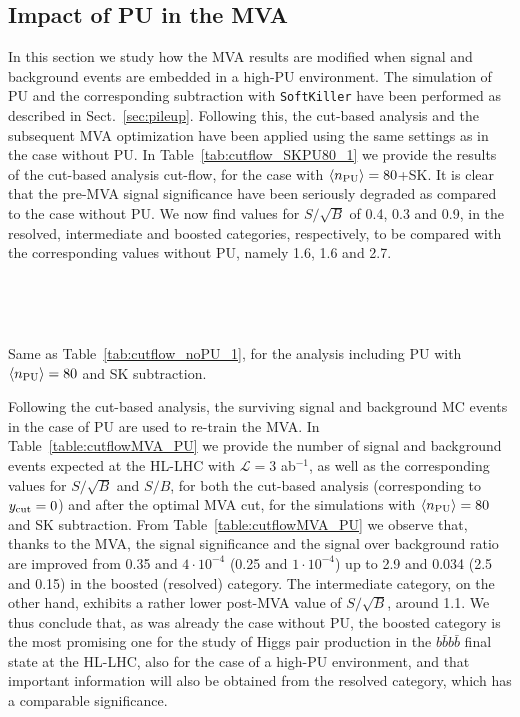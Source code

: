 \subsection{Impact of PU in the MVA}

In this section we study how the MVA results are modified when
signal and background events are embedded in a high-PU environment.
%
The simulation of PU and the corresponding subtraction with
{\tt SoftKiller} have been performed as described
in Sect.~\ref{sec:pileup}.
%
Following this, the cut-based analysis and the subsequent
MVA optimization have been applied using the same
settings as in the case without PU.
%
In Table~\ref{tab:cutflow_SKPU80_1} we provide the results
of the cut-based analysis cut-flow, for the case with $\left\langle n_{\rm PU}\right\rangle=80$+SK.
%
It is clear that the pre-MVA 
signal significance have been seriously degraded
as compared to the case without PU.
%
We now find values for $S/\sqrt{B}$ of 0.4, 0.3 and 0.9, in the resolved,
intermediate and boosted categories, respectively, to be compared
with the corresponding values without PU, namely 1.6, 1.6 and 2.7.
%


\begin{table}[t]
  \centering
  \scriptsize
  
  $\,$ \\
  \vspace{0.5cm}
  
  $\,$ \\
  \vspace{0.5cm}
    
    \caption{\small
      Same as Table~\ref{tab:cutflow_noPU_1}, for the analysis
      including PU with $\left\langle n_{\rm PU}\right\rangle=80$ and SK subtraction.
      \label{tab:cutflow_SKPU80_1}}
\end{table}

Following the cut-based analysis, the surviving signal and background
MC events in the case of PU are used to re-train the MVA.
%
In Table~\ref{table:cutflowMVA_PU}
we provide  the number of signal and
    background events expected
    at the HL-LHC with $\mathcal{L}=3$ ab$^{-1}$,
    as well as the
    corresponding values for $S/\sqrt{B}$ and $S/B$,
    for both the cut-based analysis (corresponding
    to $y_{\rm cut}=0$) and after the
    optimal MVA cut, for the simulations
    with $\left\langle n_{\rm PU}\right\rangle=80$
    and SK subtraction.
    From Table~\ref{table:cutflowMVA_PU} we observe that, thanks
to the MVA, the signal significance and the
signal over background ratio are improved from 0.35 and $4\cdot 10^{-4}$
(0.25 and $1\cdot 10^{-4}$) up to 2.9 and 0.034 (2.5 and 0.15)
in the boosted (resolved) category.
%
The intermediate category, on the other hand, exhibits a rather lower post-MVA value of $S/\sqrt{B}$, around
1.1.
%
We thus conclude that, as was already the case
without PU,
the boosted category is the most promising
one for the study of Higgs pair production in the $b\bar{b}b\bar{b}$
final state
at the HL-LHC, also for the case of a high-PU environment, and that
important information will also be obtained from
the resolved category, which has a comparable significance.


